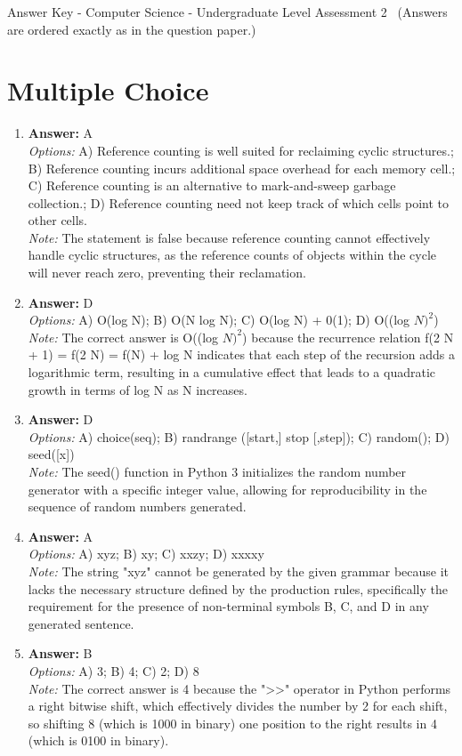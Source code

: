\documentclass[12pt]{article}
\begin{document}
\begin{center}
Answer Key - Computer Science - Undergraduate Level Assessment 2 \
\small (Answers are ordered exactly as in the question paper.)
\end{center}

\section*{Multiple Choice}
\begin{enumerate}[label=\arabic*.]
\item \textbf{Answer:} A
\\ \textit{Options:} A) Reference counting is well suited for reclaiming cyclic structures.; B) Reference counting incurs additional space overhead for each memory cell.; C) Reference counting is an alternative to mark-and-sweep garbage collection.; D) Reference counting need not keep track of which cells point to other cells.
\\ \textit{Note:} The statement is false because reference counting cannot effectively handle cyclic structures, as the reference counts of objects within the cycle will never reach zero, preventing their reclamation.
\item \textbf{Answer:} D
\\ \textit{Options:} A) O(log N); B) O(N log N); C) O(log N) + 0(1); D) O((log $N)^2$)
\\ \textit{Note:} The correct answer is O((log $N)^2$) because the recurrence relation f(2 N + 1) = f(2 N) = f(N) + log N indicates that each step of the recursion adds a logarithmic term, resulting in a cumulative effect that leads to a quadratic growth in terms of log N as N increases.
\item \textbf{Answer:} D
\\ \textit{Options:} A) choice(seq); B) randrange ([start,] stop [,step]); C) random(); D) seed([x])
\\ \textit{Note:} The seed() function in Python 3 initializes the random number generator with a specific integer value, allowing for reproducibility in the sequence of random numbers generated.
\item \textbf{Answer:} A
\\ \textit{Options:} A) xyz; B) xy; C) xxzy; D) xxxxy
\\ \textit{Note:} The string "xyz" cannot be generated by the given grammar because it lacks the necessary structure defined by the production rules, specifically the requirement for the presence of non-terminal symbols B, C, and D in any generated sentence.
\item \textbf{Answer:} B
\\ \textit{Options:} A) 3; B) 4; C) 2; D) 8
\\ \textit{Note:} The correct answer is 4 because the "\textgreater{}\textgreater{}" operator in Python performs a right bitwise shift, which effectively divides the number by 2 for each shift, so shifting 8 (which is 1000 in binary) one position to the right results in 4 (which is 0100 in binary).
\end{enumerate}
\end{document}

